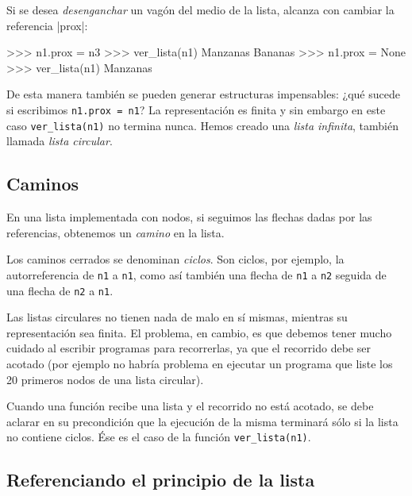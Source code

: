 Si se desea \emph{desenganchar} un vagón del medio de la lista, alcanza con
cambiar la referencia |prox|:

\begin{codigo-python-sn}
>>> n1.prox = n3
>>> ver_lista(n1)
Manzanas
Bananas
>>> n1.prox = None
>>> ver_lista(n1)
Manzanas
\end{codigo-python-sn}

De esta manera también se pueden generar estructuras impensables:
¿qué sucede si escribimos \lstinline!n1.prox = n1!? La representación es finita
y sin embargo en este caso \lstinline!ver_lista(n1)! no termina nunca. Hemos
creado una \emph{lista infinita}, también llamada \emph{lista circular}.


\subsection{Caminos}

En una lista implementada con nodos, si seguimos las flechas
dadas por las referencias, obtenemos un \emph{camino} en la lista.

Los caminos cerrados se denominan \emph{ciclos}. Son ciclos, por ejemplo, la
autorreferencia de \lstinline|n1| a \lstinline|n1|, como así también una
flecha de \lstinline|n1| a \lstinline|n2| seguida de una flecha de
\lstinline|n2| a \lstinline|n1|.

\begin{atencion}
Las listas circulares no tienen nada de malo en sí mismas,
mientras su representación sea finita. El problema, en cambio, es que debemos tener
mucho cuidado al escribir programas para recorrerlas, ya que el recorrido
debe ser acotado (por ejemplo no habría problema en ejecutar un programa
que liste los 20 primeros nodos de una lista circular).

Cuando una función recibe una lista y el recorrido no está acotado,
se debe aclarar en su precondición que la ejecución de la misma terminará
sólo si la lista no contiene ciclos. Ése es el caso de la función
\lstinline|ver_lista(n1)|.
\end{atencion}

\subsection{Referenciando el principio de la lista}

